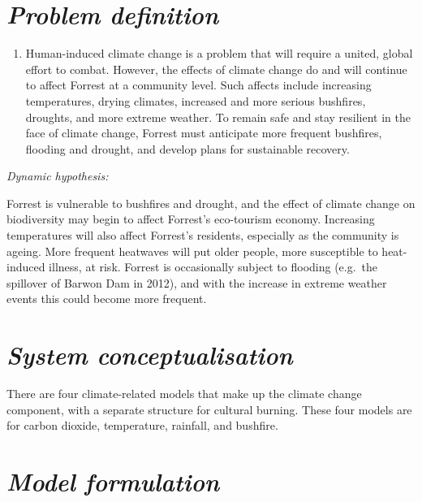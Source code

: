 \documentclass[
  11pt,
]{book}
\providecommand{\tightlist}{%
  \setlength{\itemsep}{0pt}\setlength{\parskip}{0pt}}
\begin{document}
\hypertarget{problem-definition-6}{%
\section{\texorpdfstring{\emph{Problem definition}}{Problem definition}}\label{problem-definition-6}}

\begin{enumerate}
\def\labelenumi{\arabic{enumi}.}
\tightlist
\item
  Human-induced climate change is a problem that will require a united, global effort to combat. However, the effects of climate change do and will continue to affect Forrest at a community level. Such affects include increasing temperatures, drying climates, increased and more serious bushfires, droughts, and more extreme weather. To remain safe and stay resilient in the face of climate change, Forrest must anticipate more frequent bushfires, flooding and drought, and develop plans for sustainable recovery.
\end{enumerate}

\emph{Dynamic hypothesis:}

Forrest is vulnerable to bushfires and drought, and the effect of climate change on biodiversity may begin to affect Forrest's eco-tourism economy. Increasing temperatures will also affect Forrest's residents, especially as the community is ageing. More frequent heatwaves will put older people, more susceptible to heat-induced illness, at risk. Forrest is occasionally subject to flooding (e.g.~the spillover of Barwon Dam in 2012), and with the increase in extreme weather events this could become more frequent.

\hypertarget{system-conceptualisation-3}{%
\section{\texorpdfstring{\emph{System conceptualisation}}{System conceptualisation}}\label{system-conceptualisation-3}}

There are four climate-related models that make up the climate change component, with a separate structure for cultural burning. These four models are for carbon dioxide, temperature, rainfall, and bushfire.

\hypertarget{model-formulation-3}{%
\section{\texorpdfstring{\emph{Model formulation}}{Model formulation}}\label{model-formulation-3}}
\end{document}
